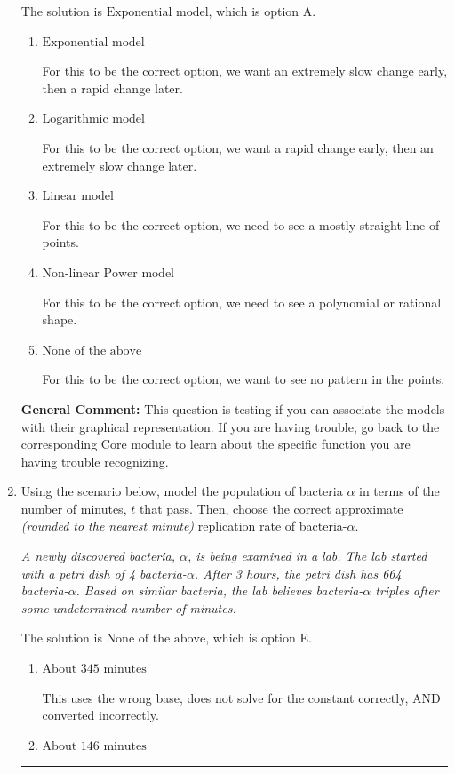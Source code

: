 \documentclass{extbook}[14pt]
\newcommand{\litem}[1]{\item #1

\rule{\textwidth}{0.4pt}}
\begin{document}
\begin{enumerate}
{The solution is \( \text{Exponential model} \), which is option A.\begin{enumerate}[label=\Alph*.]
\item \( \text{Exponential model} \)

For this to be the correct option, we want an extremely slow change early, then a rapid change later.
\item \( \text{Logarithmic model} \)

For this to be the correct option, we want a rapid change early, then an extremely slow change later.
\item \( \text{Linear model} \)

For this to be the correct option, we need to see a mostly straight line of points.
\item \( \text{Non-linear Power model} \)

For this to be the correct option, we need to see a polynomial or rational shape.
\item \( \text{None of the above} \)

For this to be the correct option, we want to see no pattern in the points.
\end{enumerate}

\textbf{General Comment:} This question is testing if you can associate the models with their graphical representation. If you are having trouble, go back to the corresponding Core module to learn about the specific function you are having trouble recognizing.
}
\litem{
Using the scenario below, model the population of bacteria $\alpha$ in terms of the number of minutes, $t$ that pass. Then, choose the correct approximate \textit{(rounded to the nearest minute)} replication rate of bacteria-$\alpha$.

\begin{center}
    \textit{ A newly discovered bacteria, $\alpha$, is being examined in a lab. The lab started with a petri dish of 4 bacteria-$\alpha$. After 3 hours, the petri dish has 664 bacteria-$\alpha$. Based on similar bacteria, the lab believes bacteria-$\alpha$ triples after some undetermined number of minutes. }
\end{center}
The solution is \( \text{None of the above} \), which is option E.\begin{enumerate}[label=\Alph*.]
\item \( \text{About } 345 \text{ minutes} \)

This uses the wrong base, does not solve for the constant correctly, AND converted incorrectly.
\item \( \text{About } 146 \text{ minutes} \)


\end{enumerate}}
\end{enumerate}
\end{document}
